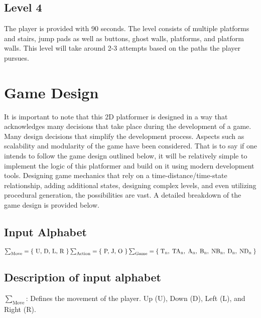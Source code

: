 \documentclass[10pt,twocolumn]{article}
\begin{document}
\subsection*{Level 4}
The player is provided with 90 seconds. The level consists of multiple platforms and stairs, jump pads as well as buttons, ghost walls, platforms, and platform walls. This level will take around 2-3 attempts based on the paths the player pursues.

\section*{Game Design}
It is important to note that this 2D platformer is designed in a way that acknowledges many decisions that take place during the development of a game. Many design decisions that simplify the development process. Aspects such as scalability and modularity of the game have been considered. That is to say if one intends to follow the game design outlined below, it will be relatively simple to implement the logic of this platformer and build on it using modern development tools. Designing game mechanics that rely on a time-distance/time-state relationship, adding additional states, designing complex levels, and even utilizing procedural generation, the possibilities are vast. A detailed breakdown of the game design is provided below.

\subsection*{Input Alphabet}
\begin{math}
  \sum_{\text{Move}} = \{\text{ U, D, L, R }\} \\\\
  \sum_{\text{Action}} = \{\text{ P, J, O }\} \\\\
  \sum_{\text{Game}} = \{  \;
  \text{T}_{\text{n}},  \;
  \text{TA}_{\text{n}}, \;
  \text{A}_{\text{n}},  \;
  \text{B}_{\text{n}},  \;
  \text{NB}_{\text{n}}, \;
  \text{D}_{\text{n}},  \;
  \text{ND}_{\text{n}}  \;
  \}
\end{math}

\subsection*{Description of input alphabet}
\noindent
$\sum_{\text{Move}}$: Defines the movement of the player. Up (U), Down (D), Left (L), and Right (R). \\\\
\end{document}
